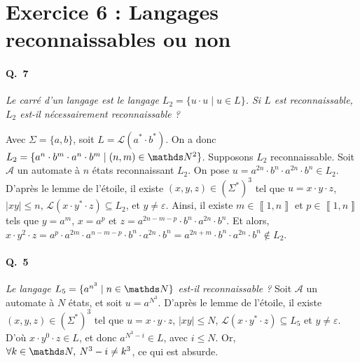 \section{Exercice 6 : Langages reconnaissables ou non}

\paragraph{Q.\ 7}
{\slshape Le carré d'un langage est le langage $L_2 = \{u\cdot u \mid u \in L\}$. Si $L$\/ est reconnaissable, $L_2$\/ est-il nécessairement reconnaissable ?}

Avec $\Sigma = \{a,b\}$, soit $L = \mathcal{L}(a^* \cdot b^*)$. On a donc $L_2 = \{a^n \cdot b^m \cdot a^n \cdot b^m  \mid (n,m) \in \N^2\}$. Supposons $L_2$\/ reconnaissable. Soit $\mathcal{A}$\/ un automate à $n$\/ états reconnaissant $L_2$.
On pose $u = a^{2n} \cdot b^n \cdot a^{2n} \cdot b^n \in L_2$. D'après le lemme de l'étoile, il existe $(x,y,z) \in (\Sigma^*)^3$\/ tel que $u = x\cdot y\cdot z$, $|xy| \le n$, $\mathcal{L}(x\cdot y^* \cdot z) \subseteq L_2$, et $y \neq \varepsilon$. Ainsi, il existe $m \in \left\llbracket 1,n \right\rrbracket$\/ et $p \in \left\llbracket 1,n \right\rrbracket$\/ tels que $y = a^{m}$, $x = a^{p}$\/ et $z = a^{2n-m-p} \cdot  b^{n} \cdot a^{2n} \cdot b^n$. Et alors, $x\cdot y^2\cdot z = a^{p}\cdot a^{2m} \cdot a^{n-m-p} \cdot  b^n \cdot a^{2n}\cdot b^n = a^{2n+m} \cdot b^n \cdot a^{2n} \cdot b^n \not\in L_2$.

\paragraph{Q.\ 5} {\slshape Le langage $L_5 = \{a^{n^3}  \mid n \in \N\}$\/ est-il reconnaissable ?}
Soit $\mathcal{A}$\/ un automate à $N$\/ états, et soit $u = a^{N^3}$.
D'après le lemme de l'étoile, il existe $(x,y,z) \in (\Sigma^*)^3$\/ tel que $u = x\cdot y\cdot z$, $|xy| \le N$, $\mathcal{L}(x\cdot y^*\cdot z) \subseteq L_5$\/ et $y \neq \varepsilon$.
D'où $x\cdot y^{0}\cdot z \in L$, et donc $a^{N^3 - i} \in L$, avec $i\le N$. Or, $\forall k \in \N,\:N^3 - i \neq k^3$, ce qui est absurde.

